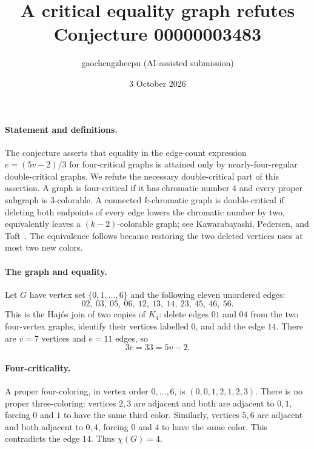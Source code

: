 \documentclass[10pt]{article}
\title{A critical equality graph refutes Conjecture 00000003483}
\author{gaochengzhecpu (AI-assisted submission)}
\date{3 October 2026}
\begin{document}
\maketitle

\paragraph{Statement and definitions.}
The conjecture asserts that equality in the edge-count expression
$e=(5v-2)/3$ for four-critical graphs is attained only by nearly-four-regular
double-critical graphs. We refute the necessary double-critical part of this assertion.
A graph is four-critical if it has chromatic number $4$ and every proper subgraph is $3$-colorable.
A connected $k$-chromatic graph is double-critical if deleting both endpoints of
every edge lowers the chromatic number by two, equivalently leaves a $(k-2)$-colorable
graph; see Kawarabayashi, Pedersen, and Toft~\cite{KPT}.
The equivalence follows because restoring the two deleted vertices uses at most two new colors.

\paragraph{The graph and equality.}
Let $G$ have vertex set $\{0,1,\ldots,6\}$ and the following eleven unordered edges:
\[
02,\ 03,\ 05,\ 06,\ 12,\ 13,\ 14,\ 23,\ 45,\ 46,\ 56.
\]
This is the Haj\'os join of two copies of $K_4$: delete edges $01$ and $04$
from the two four-vertex graphs, identify their vertices labelled $0$,
and add the edge $14$.
There are $v=7$ vertices and $e=11$ edges, so
\[
3e=33=5v-2.
\]

\paragraph{Four-criticality.}
A proper four-coloring, in vertex order $0,\ldots,6$, is
$(0,0,1,2,1,2,3)$.
There is no proper three-coloring: vertices $2,3$ are adjacent and both are
adjacent to $0,1$, forcing $0$ and $1$ to have the same third color.
Similarly, vertices $5,6$ are adjacent and both adjacent to $0,4$,
forcing $0$ and $4$ to have the same color.
This contradicts the edge $14$.
Thus $\chi(G)=4$.
\end{document}
